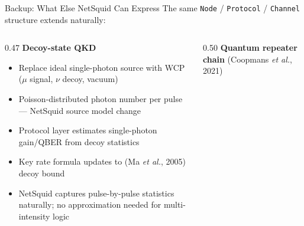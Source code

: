 \documentclass[10pt]{beamer}
\begin{document}
\begin{frame}{Backup: What Else NetSquid Can Express}
    \small The same \texttt{Node} / \texttt{Protocol} / \texttt{Channel} structure extends naturally:

    \vspace{0.2cm}
    \begin{columns}[T]
        \begin{column}{0.47\textwidth}
            \textbf{Decoy-state QKD}
            \begin{itemize}\scriptsize
                \item Replace ideal single-photon source with WCP ($\mu$ signal, $\nu$ decoy, vacuum)
                \item Poisson-distributed photon number per pulse — NetSquid source model change
                \item Protocol layer estimates single-photon gain/QBER from decoy statistics
                \item Key rate formula updates to (Ma \textit{et al.}, 2005) decoy bound
                \item NetSquid captures pulse-by-pulse statistics naturally; no approximation needed for multi-intensity logic
            \end{itemize}
        \end{column}
        \begin{column}{0.50\textwidth}
            \textbf{Quantum repeater chain} \textnormal{\scriptsize (Coopmans \textit{et al.}, 2021)}
            \begin{center}
\end{center}
\end{column}
\end{columns}
\end{frame}
\end{document}

